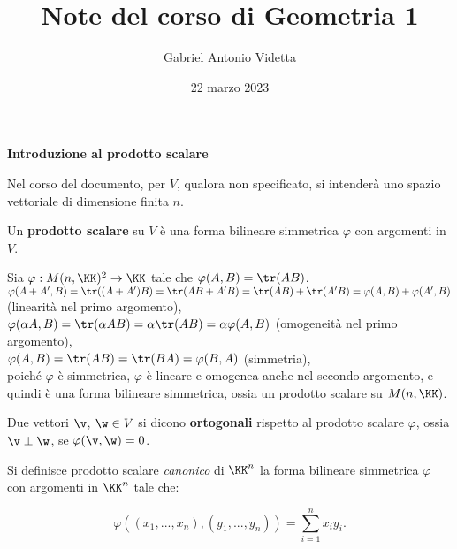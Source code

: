 \documentclass[11pt]{article}
\title{\textbf{Note del corso di Geometria 1}}
\author{Gabriel Antonio Videtta}
\date{22 marzo 2023}
\begin{document}
	
	\maketitle
	
	\begin{center}
		\Large \textbf{Introduzione al prodotto scalare}
	\end{center}

	\begin{note}
		Nel corso del documento, per $V$, qualora non specificato, si intenderà uno spazio vettoriale di dimensione
		finita $n$.
	\end{note}

	\begin{definition} 
		Un \textbf{prodotto scalare} su $V$ è una forma bilineare simmetrica $\varphi$ con argomenti in $V$.
	\end{definition}

	\begin{example}
		Sia $\varphi : M(n, \KK)^2 \to \KK$ tale che $\varphi(A, B) = \tr(AB)$. \\
		
		\li $\varphi(A + A', B) = \tr((A + A')B) = \tr(AB + A'B) = \tr(AB) + \tr(A'B) = \varphi(A, B) + \varphi(A', B)$ (linearità
		nel primo argomento), \\
		\li $\varphi(\alpha A, B) = \tr(\alpha A B) = \alpha \tr(AB) = \alpha \varphi(A, B)$ (omogeneità nel primo argomento), \\
		\li $\varphi(A, B) = \tr(AB) = \tr(BA) = \varphi(B, A)$ (simmetria), \\
		\li poiché $\varphi$ è simmetrica, $\varphi$ è lineare e omogenea anche nel secondo argomento, e quindi è una
		forma bilineare simmetrica, ossia un prodotto scalare su $M(n, \KK)$.
	\end{example}
	
	\begin{definition} 
		Due vettori $\v$, $\w \in V$ si dicono \textbf{ortogonali} rispetto al prodotto scalare $\varphi$, ossia $\v \perp \w$, se $\varphi(\v, \w) = 0$.
	\end{definition}

	\begin{definition}
		Si definisce prodotto scalare \textit{canonico} di $\KK^n$ la forma bilineare simmetrica $\varphi$ con
		argomenti in $\KK^n$ tale che:
		
		\[ \varphi((x_1, ..., x_n), (y_1, ..., y_n)) = \sum_{i=1}^n x_i y_i. \]
	\end{definition}
\end{document}
